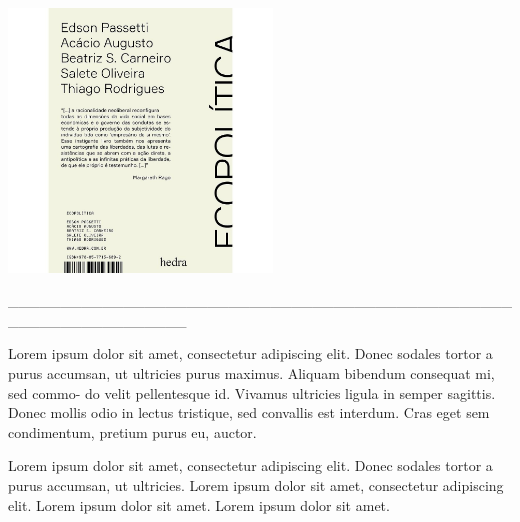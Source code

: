 \pagebreak

\hspace{.5cm}

\begin{center}
\hspace*{-1cm}\includegraphics[width=70mm]{eco.jpeg}
\hspace*{9cm}
\end{center}

\hspace*{-2cm}\_\_\_\_\_\_\_\_\_\_\_\_\_\_\_\_\_\_\_\_\_\_\_\_\_\_\_\_\_\_\_\_\_\_\_\_\_\_\_\_\_\_\_\_\_\_\_\_\_\_\_\_\_\_\_\_\_\_\_\_\_\_\_\_\_

\noindent{}Lorem ipsum dolor sit amet, consectetur adipiscing elit.
Donec sodales tortor a purus accumsan, ut ultricies purus
maximus. Aliquam bibendum consequat mi, sed commo-
do velit pellentesque id. Vivamus ultricies ligula in semper
sagittis. Donec mollis odio in lectus tristique, sed convallis
est interdum. Cras eget sem condimentum, pretium purus
eu, auctor.

\hspace{.5cm}

\hspace*{-.4cm}\begin{minipage}[c]{0.45\linewidth}
\small{
{}}
\end{minipage}
\begin{minipage}[c]{0.50\linewidth}
\small{Lorem ipsum dolor sit amet, consectetur adipiscing elit.
Donec sodales tortor a purus accumsan, ut ultricies. Lorem ipsum dolor sit amet, consectetur adipiscing elit. Lorem ipsum dolor sit amet. Lorem ipsum dolor sit amet.} 
\end{minipage}